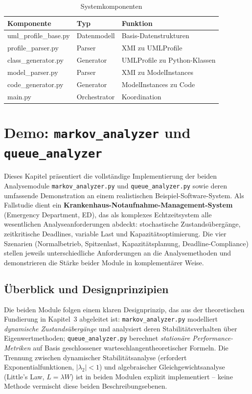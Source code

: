﻿\documentclass[a4paper,12pt]{scrreprt}
\theoremstyle{definition}
\begin{document}
\begin{table}[h]
	\centering
	\begin{tabular}{@{}llp{5cm}@{}}
		\toprule
		\textbf{Komponente} & \textbf{Typ} & \textbf{Funktion} \\
		\midrule
		uml\_profile\_base.py & Datenmodell & Basis-Datenstrukturen \\
		profile\_parser.py & Parser & XMI zu UMLProfile \\
		class\_generator.py & Generator & UMLProfile zu Python-Klassen \\
		model\_parser.py & Parser & XMI zu ModelInstances \\
		code\_generator.py & Generator & ModelInstances zu Code \\
		main.py & Orchestrator & Koordination \\
		\bottomrule
	\end{tabular}
	\caption{Systemkomponenten}
	\label{tab:components}
\end{table}


\section{Demo: \texttt{markov\_analyzer} und \texttt{queue\_analyzer}}
\label{sec:demo}

Dieses Kapitel präsentiert die vollständige Implementierung der beiden
Analysemodule \texttt{markov\_analyzer.py} und \texttt{queue\_analyzer.py}
sowie deren umfassende Demonstration an einem realistischen Beispiel-Software-System.
Als Fallstudie dient ein \textbf{Krankenhaus-Notaufnahme-Management-System}
(Emergency Department, ED), das als komplexes Echtzeitsystem alle wesentlichen
Analyseanforderungen abdeckt: stochastische Zustandsübergänge, zeitkritische
Deadlines, variable Last und Kapazitätsoptimierung. Die vier Szenarien
(Normalbetrieb, Spitzenlast, Kapazitätsplanung, Deadline-Compliance) stellen
jeweils unterschiedliche Anforderungen an die Analysemethoden und demonstrieren
die Stärke beider Module in komplementärer Weise.

\subsection{Überblick und Designprinzipien}

Die beiden Module folgen einem klaren Designprinzip, das aus der
theoretischen Fundierung in Kapitel~3 abgeleitet ist:
\texttt{markov\_analyzer.py} modelliert \emph{dynamische Zustandsübergänge}
und analysiert deren Stabilitätsverhalten über Eigenwertmethoden;
\texttt{queue\_analy\newline zer.py} berechnet \emph{stationäre Performance-Metriken}
auf Basis geschlossener warteschlangentheoretischer Formeln.
Die Trennung zwischen dynamischer Stabilitätsanalyse
(erfordert Exponentialfunktionen, $|\lambda_2| < 1$) und algebraischer
Gleichgewichtsanalyse (Little's Law, $L = \lambda W$) ist in beiden Modulen
explizit implementiert -- keine Methode vermischt diese beiden Beschreibungsebenen.
\end{document}
